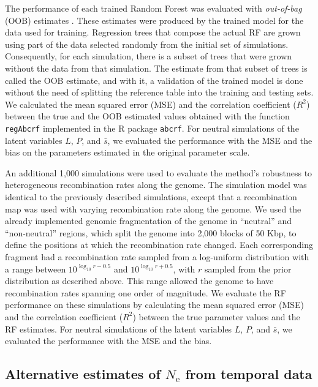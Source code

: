 \documentclass[a4paper, 12pt]{article}
\begin{document}
The performance of each trained Random Forest was evaluated with \textit{out-of-bag} (OOB) estimates \citep{Breiman:2001fb}. These estimates were produced by the trained model for the data used for training. Regression trees that compose the actual RF are grown using part of the data selected randomly from the initial set of simulations. Consequently, for each simulation, there is a subset of trees that were grown without the data from that simulation. The estimate from that subset of trees is called the OOB estimate, and with it, a validation of the trained model is done without the need of splitting the reference table into the training and testing sets. We calculated the mean squared error (MSE) and the correlation coefficient ($R^2$) between the true and the OOB estimated values obtained with the function \texttt{regAbcrf} implemented in the R package \texttt{abcrf}. For neutral simulations of the latent variables $L$, $P$, and $\bar{s}$, we evaluated the performance with the MSE and the bias on the parameters estimated in the original parameter scale.
 
An additional 1,000 simulations were used to evaluate the method's robustness to heterogeneous recombination rates along the genome. The simulation model was identical to the previously described simulations, except that a recombination map was used with varying recombination rate along the genome. We used the already implemented genomic fragmentation of the genome in ``neutral'' and ``non-neutral'' regions, which split the genome into 2,000 blocks of 50 Kbp, to define the positions at which the recombination rate changed. Each corresponding fragment had a recombination rate sampled from a log-uniform distribution with a range between $10^{\log_{10}r - 0.5}$ and $10^{\log_{10}r + 0.5}$, with $r$ sampled from the prior distribution as described above. This range allowed the genome to have recombination rates spanning one order of magnitude. We evaluate the RF performance on these simulations by calculating the mean squared error (MSE) and the correlation coefficient ($R^2$) between the true parameter values and the RF estimates. For neutral simulations of the latent variables $L$, $P$, and $\bar{s}$, we evaluated the performance with the MSE and the bias.

\subsection*{Alternative estimates of $N_\mathrm{e}$ from temporal data}
\end{document}
